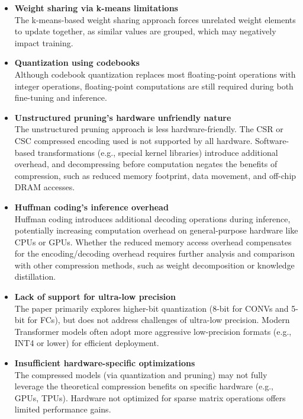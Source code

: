 \documentclass[12pt]{article}
\begin{document}
\begin{itemize}
    \item \textbf{Weight sharing via k-means limitations}\\
    The k-means-based weight sharing approach forces unrelated weight elements to update together, as similar values are grouped, which may negatively impact training.

    \item \textbf{Quantization using codebooks}\\
    Although codebook quantization replaces most floating-point operations with integer operations, floating-point computations are still required during both fine-tuning and inference.

    \item \textbf{Unstructured pruning's hardware unfriendly nature}\\
    The unstructured pruning approach is less hardware-friendly. The CSR or CSC compressed encoding used is not supported by all hardware. Software-based transformations (e.g., special kernel libraries) introduce additional overhead, and decompressing before computation negates the benefits of compression, such as reduced memory footprint, data movement, and off-chip DRAM accesses.

    \item \textbf{Huffman coding's inference overhead}\\
    Huffman coding introduces additional decoding operations during inference, potentially increasing computation overhead on general-purpose hardware like CPUs or GPUs. Whether the reduced memory access overhead compensates for the encoding/decoding overhead requires further analysis and comparison with other compression methods, such as weight decomposition or knowledge distillation.

    \item \textbf{Lack of support for ultra-low precision}\\
    The paper primarily explores higher-bit quantization (8-bit for CONVs and 5-bit for FCs), but does not address challenges of ultra-low precision. Modern Transformer models often adopt more aggressive low-precision formats (e.g., INT4 or lower) for efficient deployment.

    \item \textbf{Insufficient hardware-specific optimizations}\\
    The compressed models (via quantization and pruning) may not fully leverage the theoretical compression benefits on specific hardware (e.g., GPUs, TPUs). Hardware not optimized for sparse matrix operations offers limited performance gains.


\end{itemize}
\end{document}
